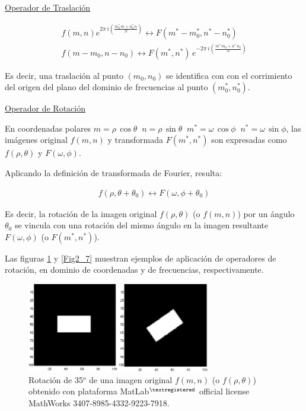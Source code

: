 \underline{Operador de Traslaci\'on}

\vspace{0.5cm}

\begin{eqnarray}
	f(m, n)e^{2 \pi \, i (\frac{m^* _{0} \, m + n^* _{0} \, n}{N})} \leftrightarrow F(m^* - m^* _{0}, n^* - n^* _{0}) \\
	f(m - m_{0}, n - n_{0}) \leftrightarrow F(m^*, n^*) \, e^{-2 \pi \, i (\frac{m^* \, m_{0} + n^* \, n_{0}}{N})} \nonumber
\label{EqLX}
\end{eqnarray}

Es decir, una traslaci\'on al punto $(m_{0}, n_{0})$ se identifica con con el corrimiento del origen del plano del dominio de frecuencias al punto 
$(m^*_{0}, n^*_{0})$.
%
\vspace{1.0cm}

\underline{Operador de Rotaci\'on}

\vspace{0.5cm}

En coordenadas polares $m = \rho \, \cos{\theta} \; \; n = \rho \, \sin{\theta} \; \; m^* = \omega \, \cos{\phi} \; \; n^* = \omega \, \sin{\phi}$, las im\'agenes 
original $f(m, n)$ y transformada $F(m^*, n^*)$ son expresadas como $f(\rho, \theta)$ y $F(\omega, \phi)$.
%

%
Aplicando la definici\'on de transformada de Fourier, resulta:

\begin{eqnarray}
	f(\rho, \theta + \theta_{0}) \leftrightarrow F(\omega, \phi + \theta_{0}) 
\label{EqLXI}
\end{eqnarray}

Es decir, la rotaci\'on de la imagen original $f(\rho, \theta)$ (o $f(m, n)$) por un \'angulo $\theta_{0}$ se vincula con una rotaci\'on del mismo \'angulo en 
la imagen resultante $F(\omega, \phi)$ (o $F(m^*, n^*)$).
%

%
Las figuras \ref{Fig2_6} y \ref{Fig2_7} muestran ejemplos de aplicaci\'on de operadores de rotaci\'on, en dominio de coordenadas y de frecuencias, 
respectivamente.

\vspace{1.0cm}

\begin{center}
\begin{figure} [h!]

\centering
\includegraphics[width=8cm]{Figuras/Fig2_6.png}
   
\caption{Rotaci\'on de 35$^{o}$ de una imagen original $f(m, n)$ (o $f(\rho, \theta)$) obtenido con plataforma MatLab$^{\textregistered}$ official license MathWorks 3407-8985-4332-9223-7918.}
\label{Fig2_6}

\end{figure}
\end{center}

